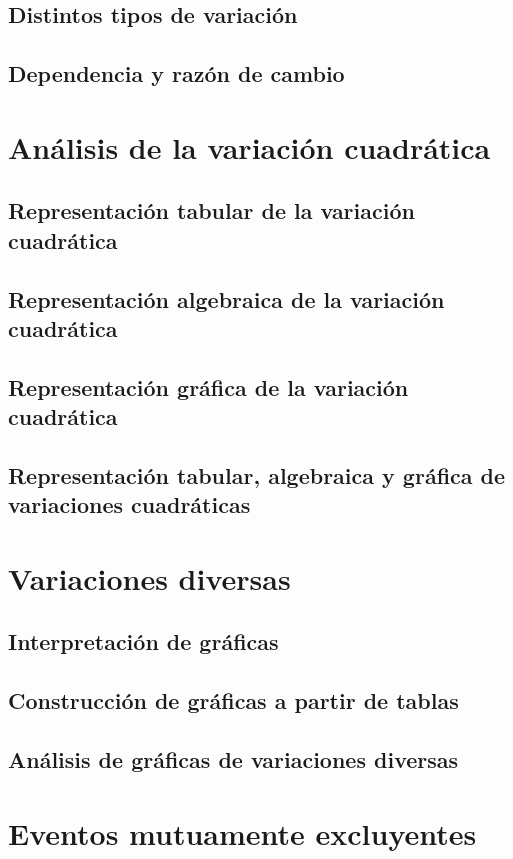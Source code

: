 \documentclass[11pt]{book}
\begin{document}
\subsection{Distintos tipos de variación}
\subsection{Dependencia y razón de cambio}

\newpage \thispagestyle{plain}
\section{Análisis de la variación cuadrática}
\subsection{Representación tabular de la variación cuadrática}
\subsection{Representación algebraica de la variación cuadrática}
\subsection{Representación gr\'afica de la variación cuadrática}
\subsection{Representación tabular, algebraica y gr\'afica de variaciones cuadráticas}

\newpage \thispagestyle{plain}
\section{Variaciones diversas}
\subsection{Interpretación de gr\'aficas}
\subsection{Construcción de gr\'aficas a partir de tablas}
\subsection{Análisis de gr\'aficas de variaciones diversas}

\newpage \thispagestyle{plain}
\section{Eventos mutuamente excluyentes}
\end{document}

